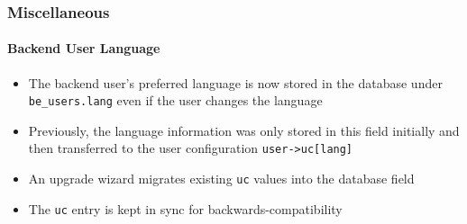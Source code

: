 %

\begin{frame}[fragile]
	\frametitle{Miscellaneous}
	\framesubtitle{Backend User Language}

	\begin{itemize}
		\item The backend user's preferred language is now stored in the
			database under \texttt{be\_users.lang} even if the user changes
			the language
		\item Previously, the language information was only stored in this
			field initially and then transferred to the user configuration
			\texttt{user->uc[lang]}
		\item An upgrade wizard migrates existing \texttt{uc} values into
			the database field
		\item The \texttt{uc} entry is kept in sync for backwards-compatibility
	\end{itemize}

\end{frame}

